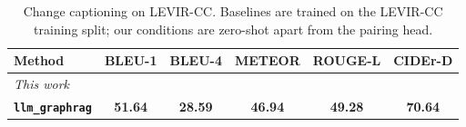 \begin{table}[t]
\centering
\caption{Change captioning on LEVIR-CC. Baselines are trained on the LEVIR-CC training split; our conditions are zero-shot apart from the pairing head.}
\label{tab:levir_cc_caption}
\setlength{\tabcolsep}{3pt}
\begin{tabular}{lccccc}
\toprule
Method & BLEU-1 & BLEU-4 & METEOR & ROUGE-L & CIDEr-D \\
\midrule
\midrule
\multicolumn{6}{l}{\emph{This work}} \\
\textbf{\texttt{llm\_graphrag}} & \textbf{51.64} & \textbf{28.59} & \textbf{46.94} & \textbf{49.28} & \textbf{70.64} \\
\bottomrule
\end{tabular}
\end{table}
